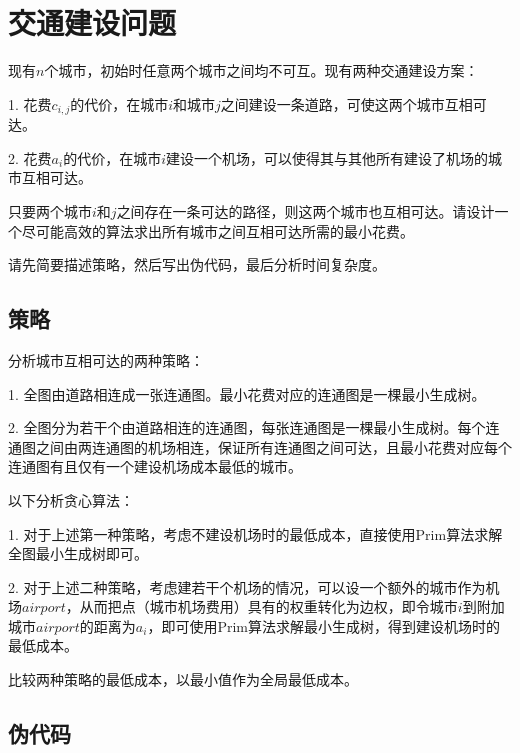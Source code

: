 \documentclass{article}
\begin{document}
\section{交通建设问题}
现有$n$个城市，初始时任意两个城市之间均不可互。现有两种交通建设方案：

1. 花费$c_{i,j}$的代价，在城市$i$和城市$j$之间建设一条道路，可使这两个城市互相可达。

2. 花费$a_i$的代价，在城市$i$建设一个机场，可以使得其与其他所有建设了机场的城市互相可达。

只要两个城市$i$和$j$之间存在一条可达的路径，则这两个城市也互相可达。请设计一个尽可能高效的算法求出所有城市之间互相可达所需的最小花费。

请先简要描述策略，然后写出伪代码，最后分析时间复杂度。

\subsection{策略}

分析城市互相可达的两种策略：

1. 全图由道路相连成一张连通图。最小花费对应的连通图是一棵最小生成树。

2. 全图分为若干个由道路相连的连通图，每张连通图是一棵最小生成树。每个连通图之间由两连通图的机场相连，保证所有连通图之间可达，且最小花费对应每个连通图有且仅有一个建设机场成本最低的城市。

以下分析贪心算法：

1. 对于上述第一种策略，考虑不建设机场时的最低成本，直接使用Prim算法求解全图最小生成树即可。

2. 对于上述二种策略，考虑建若干个机场的情况，可以设一个额外的城市作为机场$airport$，从而把点（城市机场费用）具有的权重转化为边权，即令城市$i$到附加城市$airport$的距离为$a_i$，即可使用Prim算法求解最小生成树，得到建设机场时的最低成本。

比较两种策略的最低成本，以最小值作为全局最低成本。

\subsection{伪代码}
\end{document}
